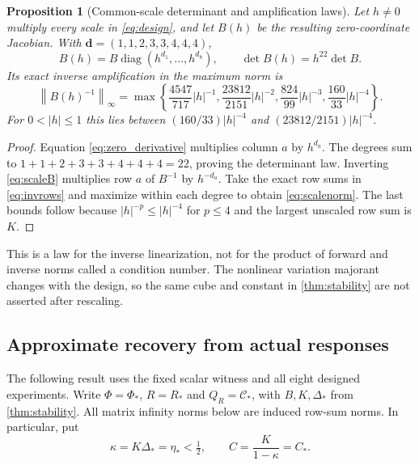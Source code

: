 \documentclass[11pt,a4paper]{article}
\numberwithin{equation}{section}
\newtheorem{proposition}[theorem]{Proposition}
\theoremstyle{definition}
\theoremstyle{remark}
\DeclareMathOperator{\diag}{diag}
\newcommand{\norm}[1]{\left\lVert #1\right\rVert}
\begin{document}
\begin{proposition}[Common-scale determinant and amplification laws]
\label{prop:scales}
Let $h\ne0$ multiply every scale in \eqref{eq:design}, and let $B(h)$
be the resulting zero-coordinate Jacobian. With
$\mathbf d=(1,1,2,3,3,4,4,4)$,
\begin{equation}\label{eq:scaleB}
 B(h)=B\diag(h^{d_1},\ldots,h^{d_8}),\qquad
 \det B(h)=h^{22}\det B.
\end{equation}
Its exact inverse amplification in the maximum norm is
\begin{equation}\label{eq:scalenorm}
 \norm{B(h)^{-1}}_\infty=\max\left\{
 \frac{4547}{717}|h|^{-1},\frac{23812}{2151}|h|^{-2},
 \frac{824}{99}|h|^{-3},\frac{160}{33}|h|^{-4}\right\}.
\end{equation}
For $0<|h|\leq1$ this lies between
$(160/33)|h|^{-4}$ and $(23812/2151)|h|^{-4}$.
\end{proposition}
\begin{proof}
Equation \eqref{eq:zero_derivative} multiplies column $a$ by $h^{d_a}$.
The degrees sum to $1+1+2+3+3+4+4+4=22$, proving the determinant law.
Inverting \eqref{eq:scaleB} multiplies row $a$ of $B^{-1}$ by
$h^{-d_a}$. Take the exact row sums in \cref{eq:invrows} and maximize
within each degree to obtain \eqref{eq:scalenorm}. The last bounds follow
because $|h|^{-p}\leq|h|^{-4}$ for $p\leq4$ and the largest unscaled
row sum is $K$.
\end{proof}
This is a law for the inverse linearization, not for the product of
forward and inverse norms called a condition number. The nonlinear
variation majorant changes with the design, so the same cube and constant
in \cref{thm:stability} are not asserted after rescaling.

\subsection{Approximate recovery from actual responses}
\label{sec:actual}
The following result uses the fixed scalar witness and all eight designed
experiments. Write $\Phi=\Phi_*$, $R=R_*$ and $Q_R=\mathcal C_*$, with
$B,K,\Delta_*$ from \cref{thm:stability}. All matrix infinity norms below
are induced row-sum norms. In particular, put
\[
 \kappa=K\Delta_*=\eta_*<\tfrac12,\qquad
 C=\frac{K}{1-\kappa}=C_*.
\]
\end{document}
